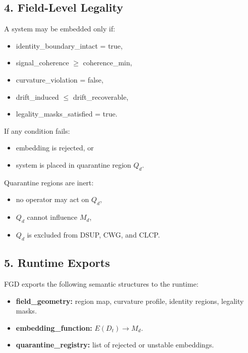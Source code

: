 \subsection*{4. Field-Level Legality}
\label{boot:fgd_legality}

A system may be embedded only if:
\begin{itemize}[leftmargin=1.2cm]
    \item identity\_boundary\_intact = true,
    \item signal\_coherence $\geq$ coherence\_min,
    \item curvature\_violation = false,
    \item drift\_induced $\leq$ drift\_recoverable,
    \item legality\_masks\_satisfied = true.
\end{itemize}

If any condition fails:
\begin{itemize}[leftmargin=1.2cm]
    \item embedding is rejected, or
    \item system is placed in quarantine region $Q_d$.
\end{itemize}

Quarantine regions are inert:
\begin{itemize}[leftmargin=1.2cm]
    \item no operator may act on $Q_d$,
    \item $Q_d$ cannot influence $M_d$,
    \item $Q_d$ is excluded from DSUP, CWG, and CLCP.
\end{itemize}

\subsection*{5. Runtime Exports}
\label{boot:fgd_exports}

FGD exports the following semantic structures to the runtime:

\begin{itemize}[leftmargin=1.2cm]
    \item \textbf{field\_geometry:}
    region map, curvature profile, identity regions, legality masks.
    \item \textbf{embedding\_function:}
    $E(D_t) \rightarrow M_d$.
    \item \textbf{quarantine\_registry:}
    list of rejected or unstable embeddings.
\end{itemize}

